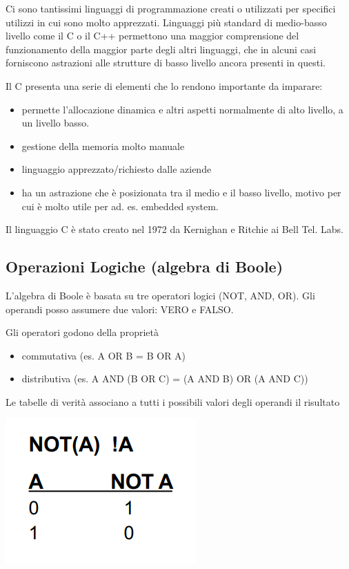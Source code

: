 \documentclass[
  paper=a4,
  oneside  ,captions=tableheading
]{scrbook}
\providecommand{\tightlist}{%
  \setlength{\itemsep}{0pt}\setlength{\parskip}{0pt}}
\begin{document}
Ci sono tantissimi linguaggi di programmazione creati o utilizzati per
specifici utilizzi in cui sono molto apprezzati. Linguaggi più standard
di medio-basso livello come il C o il C++ permettono una maggior
comprensione del funzionamento della maggior parte degli altri
linguaggi, che in alcuni casi forniscono astrazioni alle strutture di
basso livello ancora presenti in questi.

Il C presenta una serie di elementi che lo rendono importante da
imparare:

\begin{itemize}
\tightlist
\item
  permette l'allocazione dinamica e altri aspetti normalmente di alto
  livello, a un livello basso.
\item
  gestione della memoria molto manuale
\item
  linguaggio apprezzato/richiesto dalle aziende
\item
  ha un astrazione che è posizionata tra il medio e il basso livello,
  motivo per cui è molto utile per ad. es. embedded system.
\end{itemize}

Il linguaggio C è stato creato nel 1972 da Kernighan e Ritchie ai Bell
Tel. Labs.

\hypertarget{operazioni-logiche-algebra-di-boole}{%
\subsection{Operazioni Logiche (algebra di
Boole)}\label{operazioni-logiche-algebra-di-boole}}

L'algebra di Boole è basata su tre operatori logici (NOT, AND, OR). Gli
operandi posso assumere due valori: VERO e FALSO.

Gli operatori godono della proprietà

\begin{itemize}
\tightlist
\item
  commutativa (es. A OR B = B OR A)
\item
  distributiva (es. A AND (B OR C) = (A AND B) OR (A AND C))
\end{itemize}

Le tabelle di verità associano a tutti i possibili valori degli operandi
il risultato

\includegraphics{./image/image-20201207220212631-1607774144622.png}
\end{document}

